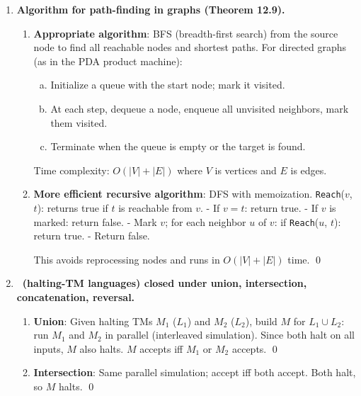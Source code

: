 \begin{enumerate}[{12.}1. ]
\textit{Caution}: it is \emph{not} enough to ask whether this particular DPDA
happens to keep its stack bounded, since a DPDA can use unbounded stack space
and still recognize a regular language. \qed

\item \textbf{Algorithm for path-finding in graphs (Theorem 12.9).}

\begin{enumerate}
\item \textbf{Appropriate algorithm}: BFS (breadth-first search) from the source node to find all reachable nodes and shortest paths. For directed graphs (as in the PDA product machine):
\begin{enumerate}[a.]
\item Initialize a queue with the start node; mark it visited.
\item At each step, dequeue a node, enqueue all unvisited neighbors, mark them visited.
\item Terminate when the queue is empty or the target is found.
\end{enumerate}
Time complexity: $O(|V| + |E|)$ where $V$ is vertices and $E$ is edges.

\item \textbf{More efficient recursive algorithm}: DFS with memoization.
\texttt{Reach}($v$, $t$): returns true if $t$ is reachable from $v$.
- If $v = t$: return true.
- If $v$ is marked: return false.
- Mark $v$; for each neighbor $u$ of $v$: if \texttt{Reach}($u$, $t$): return true.
- Return false.

This avoids reprocessing nodes and runs in $O(|V|+|E|)$ time. \qed
\end{enumerate}

\item \textbf{\HSIG\ (halting-TM languages) closed under union, intersection, concatenation, reversal.}

\begin{enumerate}
\item \textbf{Union}: Given halting TMs $M_1$ ($L_1$) and $M_2$ ($L_2$), build $M$ for $L_1\cup L_2$: run $M_1$ and $M_2$ in parallel (interleaved simulation). Since both halt on all inputs, $M$ also halts. $M$ accepts iff $M_1$ or $M_2$ accepts. \qed

\item \textbf{Intersection}: Same parallel simulation; accept iff both accept. Both halt, so $M$ halts. \qed


\end{enumerate}
\end{enumerate}
